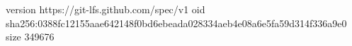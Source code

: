 version https://git-lfs.github.com/spec/v1
oid sha256:0388fc12155aae642148f0bd6ebeada028334aeb4e08a6e5fa59d314f336a9e0
size 349676
